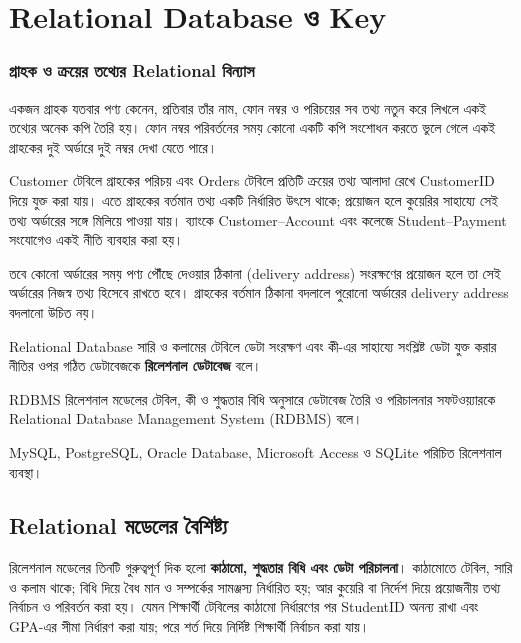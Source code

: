 \section{Relational Database ও Key}

\subsubsection{গ্রাহক ও ক্রয়ের তথ্যের Relational বিন্যাস}
একজন গ্রাহক যতবার পণ্য কেনেন, প্রতিবার তাঁর নাম, ফোন নম্বর ও পরিচয়ের সব তথ্য নতুন করে লিখলে
একই তথ্যের অনেক কপি তৈরি হয়। ফোন নম্বর পরিবর্তনের সময় কোনো একটি কপি সংশোধন করতে ভুলে গেলে
একই গ্রাহকের দুই অর্ডারে দুই নম্বর দেখা যেতে পারে।

Customer টেবিলে গ্রাহকের পরিচয় এবং Orders টেবিলে প্রতিটি ক্রয়ের তথ্য আলাদা রেখে CustomerID দিয়ে যুক্ত করা যায়।
এতে গ্রাহকের বর্তমান তথ্য একটি নির্ধারিত উৎসে থাকে; প্রয়োজন হলে কুয়েরির সাহায্যে সেই তথ্য অর্ডারের সঙ্গে
মিলিয়ে পাওয়া যায়। ব্যাংকে Customer--Account এবং কলেজে Student--Payment সংযোগেও একই নীতি ব্যবহার করা হয়।

তবে কোনো অর্ডারের সময় পণ্য পৌঁছে দেওয়ার ঠিকানা (delivery address) সংরক্ষণের প্রয়োজন হলে তা সেই অর্ডারের
নিজস্ব তথ্য হিসেবে রাখতে হবে। গ্রাহকের বর্তমান ঠিকানা বদলালে পুরোনো অর্ডারের delivery address বদলানো উচিত নয়।

\begin{definitionbox}{Relational Database}
সারি ও কলামের টেবিলে ডেটা সংরক্ষণ এবং কী-এর সাহায্যে সংশ্লিষ্ট ডেটা যুক্ত করার নীতির ওপর গঠিত ডেটাবেজকে \textbf{রিলেশনাল ডেটাবেজ} বলে।
\end{definitionbox}
\begin{definitionbox}{RDBMS}
রিলেশনাল মডেলের টেবিল, কী ও শুদ্ধতার বিধি অনুসারে ডেটাবেজ তৈরি ও পরিচালনার সফটওয়্যারকে Relational Database Management System (RDBMS) বলে।
\end{definitionbox}
MySQL, PostgreSQL, Oracle Database, Microsoft Access ও SQLite পরিচিত রিলেশনাল ব্যবস্থা।

\subsection{Relational মডেলের বৈশিষ্ট্য}
রিলেশনাল মডেলের তিনটি গুরুত্বপূর্ণ দিক হলো \textbf{কাঠামো, শুদ্ধতার বিধি এবং ডেটা পরিচালনা}। কাঠামোতে টেবিল, সারি ও কলাম থাকে; বিধি দিয়ে বৈধ মান ও সম্পর্কের সামঞ্জস্য নির্ধারিত হয়; আর কুয়েরি বা নির্দেশ দিয়ে প্রয়োজনীয় তথ্য নির্বাচন ও পরিবর্তন করা হয়। যেমন শিক্ষার্থী টেবিলের কাঠামো নির্ধারণের পর StudentID অনন্য রাখা এবং GPA-এর সীমা নির্ধারণ করা যায়; পরে শর্ত দিয়ে নির্দিষ্ট শিক্ষার্থী নির্বাচন করা যায়।


